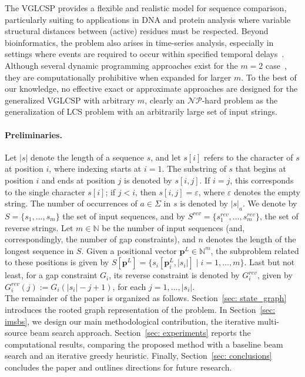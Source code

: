 \documentclass[runningheads]{llncs}
\begin{document}
The VGLCSP provides a flexible and realistic model for sequence comparison, particularly suiting to applications in DNA and protein analysis where variable structural distances between (active) residues must be respected. Beyond bioinformatics, the problem also arises in time-series analysis, especially in settings where events are required to occur within specified temporal delays~\cite{lainscsek2015delay}.\\
Although several dynamic programming approaches exist for the $m=2$ case~\cite{penga2011longest}, they are computationally prohibitive when expanded for larger $m$. To the best of our knowledge, no effective exact or approximate approaches are designed for the generalized VGLCSP with arbitrary $m$, clearly an $\mathcal{NP}$-hard problem as the generalization of LCS problem with an arbitrarily large set of input strings. \\
\vspace{-0.7cm}
\paragraph{Preliminaries.}	Let $|s|$ denote the length of a sequence $s$, and let $s[i]$ refers to the character of $s$ at position $i$, where indexing starts at $i = 1$. The substring of $s$ that begins at position $i$ and ends at position $j$ is denoted by $s[i,j]$. If $i = j$, this corresponds to the single character $s[i]$; if $j < i$, then $s[i,j] = \varepsilon$, where $\varepsilon$ denotes the empty string.	The number of occurrences of $a \in \Sigma$ in $s$ is denoted by $|s|_a$.	We denote by $S = \{s_1, \ldots, s_m\}$ the set of input sequences, and by $S^{rev} = \{s_1^{rev}, \ldots, s_m^{rev}\}$, the set of reverse strings.  
Let $m \in \mathbb{N}$ be the number of input sequences (and, correspondingly, the number of gap constraints), and $n$ denotes the length of the longest sequence in $S$.  Given a positional vector $\mathbf{p}^L \in \mathbb{N}^m$,  the subproblem related to these positions is given by $S[\mathbf{p}^L]=\{ s_i[\mathbf{p}^L_i, |s_i|] \mid i=1, \ldots, m\}$.  Last but not least, for a gap constraint $G_i$, its reverse constraint is denoted by  $G_i^{rev}$, given by $G_i^{rev}(j):=G_i(|s_i|-j+1)$, for each $j=1, \ldots, |s_i|$.  \\ 

	 The remainder of the paper is organized as follows. Section~\ref{sec: state_graph} introduces the rooted graph representation of the problem. In Section~\ref{sec: imsbs}, we  design our main methodological contribution, the iterative multi-source beam search approach. Section~\ref{sec: experiments} reports the computational results, comparing the proposed method with a baseline beam search and an iterative greedy heuristic. %
	Finally, Section~\ref{sec: conclusions} concludes the paper and outlines directions for future research.
	
\end{document}
